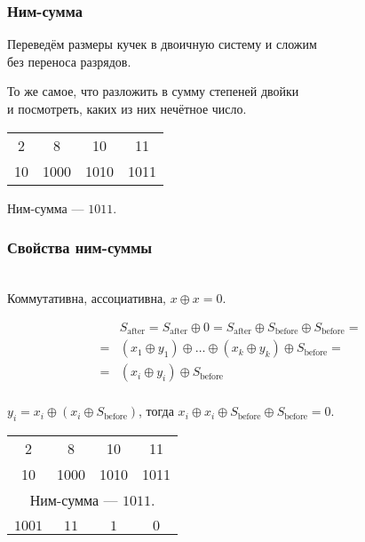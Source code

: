 \begin{frame} \frametitle{Ним-сумма}
	Переведём размеры кучек в двоичную систему и сложим \\
	без переноса разрядов.

	То же самое, что разложить в сумму степеней двойки \\
	и посмотреть, каких из них нечётное число. \medskip

\begin{center}\begin{tabular}{cccc}
2 & 8 & 10 & 11 \\
{\small 10} & {\small 1000} & {\small 1010} & {\small 1011}
\end{tabular}

Ним-сумма — $1011$. \end{center}
\end{frame}

\begin{frame} \frametitle{Свойства ним-суммы} \ \\ [-0.4cm]
	Коммутативна, ассоциативна, $x \oplus x = 0$. \vspace{-0.8cm}
\renewcommand{\sb}{S_{\text{before}}}
\newcommand{\sa}{S_{\text{after}}}

\begin{align*}
&	\sa = \sa \oplus 0 = \sa \oplus \sb \oplus \sb = \\
= &	(x_1 \oplus y_1) \oplus \ldots \oplus (x_k \oplus y_k) \oplus \sb = \\
= & (x_i \oplus y_i) \oplus \sb \\
\end{align*} \vspace{-1.3cm} \pause

$y_i = x_i \oplus (x_i \oplus \sb)$, тогда $x_i \oplus x_i \oplus \sb \oplus \sb = 0$. \pause

\begin{center}\begin{tabular}{cccc}
2 & 8 & 10 & 11 \\
{\small 10} & {\small 1000} & {\small 1010} & {\small 1011} \\
\multicolumn{4}{c}{Ним-сумма — $1011$.} \\ \pause
\phantom{ававав} & \phantom{ававав} & \phantom{ававав} & \phantom{ававав} \\
{\small $1001$} & {\small $11$} & {\small $1$} & {\small $0$} \\
\end{tabular} \end{center}
\end{frame}

